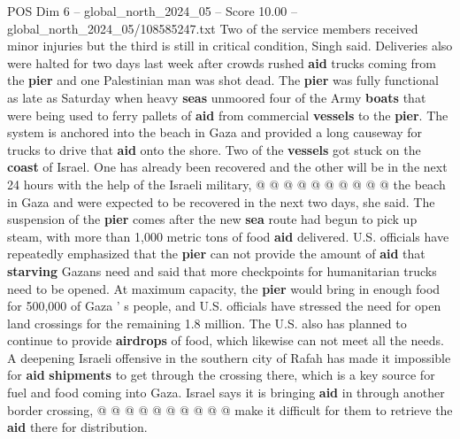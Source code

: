 \begin{textsample}{POS Dim 6 – global\_north\_2024\_05 – Score 10.00 – global\_north\_2024\_05/108585247.txt}
Two of the service members received minor injuries but the third is still in critical condition, Singh said.
Deliveries also were halted for two days last week after crowds rushed \textbf{aid} trucks coming from the \textbf{pier} and one Palestinian man was shot dead.
The \textbf{pier} was fully functional as late as Saturday when heavy \textbf{seas} unmoored four of the Army \textbf{boats} that were being used to ferry pallets of \textbf{aid} from commercial \textbf{vessels} to the \textbf{pier}.
The system is anchored into the beach in Gaza and provided a long causeway for trucks to drive that \textbf{aid} onto the shore.
Two of the \textbf{vessels} got stuck on the \textbf{coast} of Israel.
One has already been recovered and the other will be in the next 24 hours with the help of the Israeli military, @ @ @ @ @ @ @ @ @ @ the beach in Gaza and were expected to be recovered in the next two days, she said.
The suspension of the \textbf{pier} comes after the new \textbf{sea} route had begun to pick up steam, with more than 1,000 metric tons of food \textbf{aid} delivered.
U.S. officials have repeatedly emphasized that the \textbf{pier} can not provide the amount of \textbf{aid} that \textbf{starving} Gazans need and said that more checkpoints for humanitarian trucks need to be opened.
At maximum capacity, the \textbf{pier} would bring in enough food for 500,000 of Gaza ' s people, and U.S. officials have stressed the need for open land crossings for the remaining 1.8 million.
The U.S. also has planned to continue to provide \textbf{airdrops} of food, which likewise can not meet all the needs.
A deepening Israeli offensive in the southern city of Rafah has made it impossible for \textbf{aid} \textbf{shipments} to get through the crossing there, which is a key source for fuel and food coming into Gaza.
Israel says it is bringing \textbf{aid} in through another border crossing, @ @ @ @ @ @ @ @ @ @ make it difficult for them to retrieve the \textbf{aid} there for distribution.

\end{textsample}
